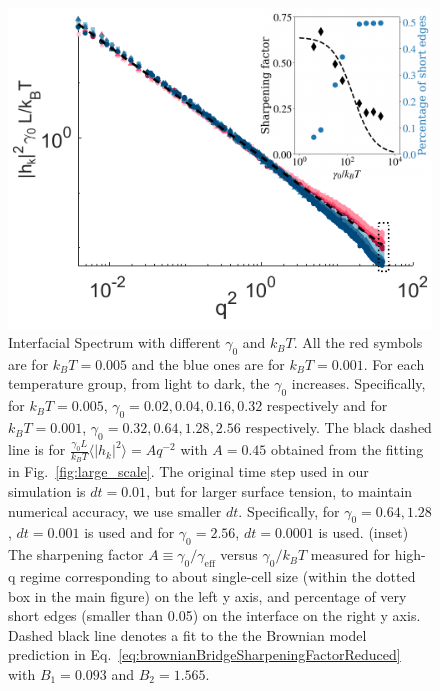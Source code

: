 \documentclass[twoside,twocolumn,9pt]{article}
\begin{document}
\begin{figure}[t]
    \centering
    \includegraphics[width=0.9\columnwidth]{Figure3.pdf}
    \caption{Interfacial Spectrum with different $\gamma_0$ and $k_B T$. All the red symbols are for $k_BT=0.005$ and the blue ones are for $k_BT=0.001$. For each temperature group, from light to dark, the $\gamma_0$ increases. Specifically, for $k_B T=0.005$, $\gamma_0=0.02,0.04,0.16,0.32$ respectively and for $k_B T=0.001$, $\gamma_0=0.32,0.64,1.28,2.56$ respectively. The black dashed line is for $\frac{\gamma_0 L}{k_BT}\langle|h_k|^2\rangle = A q^{-2}$ with $A=0.45$ obtained from the fitting in Fig.~\ref{fig:large_scale}. The original time step used in our simulation is $dt=0.01$, but for larger surface tension, to maintain numerical accuracy, we use smaller $dt$. Specifically, for $\gamma_0=0.64,1.28$, $dt=0.001$ is used and for $\gamma_0=2.56$, $dt=0.0001$ is used. (inset) The sharpening factor $A\equiv \gamma_0/\gamma_{\text{eff}}$ versus $\gamma_0/k_BT$ measured for high-q regime corresponding to about single-cell size (within the dotted box in the main figure) on the left y axis, and percentage of very short edges (smaller than 0.05) on the interface on the right y axis. Dashed black line denotes a fit to the the Brownian model prediction in Eq.~\ref{eq:brownianBridgeSharpeningFactorReduced} with $B_{1}=0.093$ and $B_{2}=1.565$.} 
    \label{fig:varyinggamma}
\end{figure}
\end{document}
